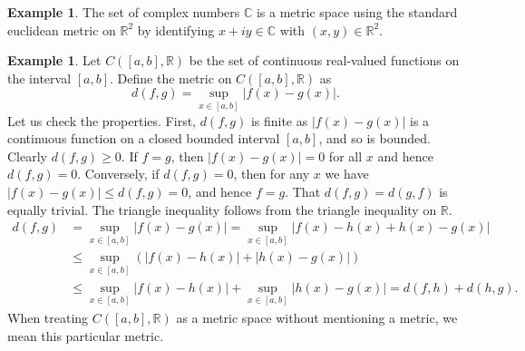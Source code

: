 \documentclass[12pt,openany]{book}
\newcommand{\abs}[1]{\left\lvert {#1} \right\rvert}
\newcommand{\C}{{\mathbb{C}}}
\newcommand{\R}{{\mathbb{R}}}
\theoremstyle{plain}
\theoremstyle{remark}
\theoremstyle{definition}
\theoremstyle{exercise}
\theoremstyle{example}
\newtheorem{example}[thm]{Example}
\begin{document}
\begin{example} \label{example:mscomplex}
The set of complex numbers $\C$ is a metric space using the standard
euclidean metric on $\R^2$
by identifying $x+iy \in \C$ with $(x,y) \in \R^2$.
\end{example}

\begin{example} \label{example:msC01}
Let $C([a,b],\R)$ be the set of continuous real-valued functions on the
interval $[a,b]$.  Define the metric on $C([a,b],\R)$ as
\begin{equation*}
d(f,g) = \sup_{x \in [a,b]} \abs{f(x)-g(x)} .
\end{equation*}
Let us check the properties.  First, $d(f,g)$ is finite as
$\abs{f(x)-g(x)}$ is a continuous function on a closed bounded interval
$[a,b]$, and so is bounded.
Clearly $d(f,g) \geq 0$. 
If $f = g$,
then $\abs{f(x)-g(x)} = 0$ for all $x$ and hence $d(f,g) = 0$.  Conversely,
if $d(f,g) = 0$, then for any $x$ we have $\abs{f(x)-g(x)} \leq d(f,g) = 0$,
and hence $f=g$.  That $d(f,g) = d(g,f)$
is equally trivial.  The triangle inequality follows from the 
triangle inequality on $\R$.
\begin{equation*}
\begin{split}
d(f,g) & =
\sup_{x \in [a,b]} \abs{f(x)-g(x)} =
\sup_{x \in [a,b]} \abs{f(x)-h(x)+h(x)-g(x)}
\\
& \leq
\sup_{x \in [a,b]} ( \abs{f(x)-h(x)}+\abs{h(x)-g(x)} )
\\
& \leq
\sup_{x \in [a,b]} \abs{f(x)-h(x)}+
\sup_{x \in [a,b]} \abs{h(x)-g(x)} = d(f,h) + d(h,g) .
\end{split}
\end{equation*}
When treating $C([a,b],\R)$ as a metric space without mentioning a metric, we mean this
particular metric.
\end{example}
\end{document}
